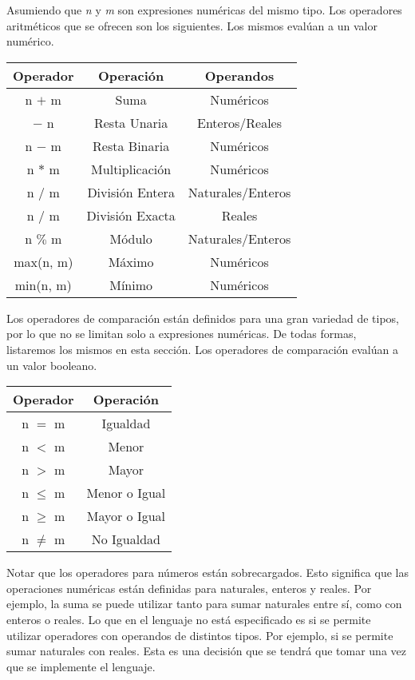 \documentclass{article}
\begin{document}
Asumiendo que \textit{n} y \textit{m} son expresiones numéricas del mismo tipo.
Los operadores aritméticos que se ofrecen son los siguientes.
Los mismos evalúan a un valor numérico.

\begin{center}
\begin{tabular}{| c | c | c |}
\hline
    Operador & Operación & Operandos\\
    \hline
    n $+$ m & Suma & Numéricos \\
    $-$ n & Resta Unaria & Enteros/Reales \\
    n $-$ m & Resta Binaria & Numéricos \\
    n $*$ m & Multiplicación & Numéricos \\
    n $/$ m & División Entera & Naturales/Enteros \\
    n $/$ m & División Exacta & Reales \\
    n $\%$ m & Módulo & Naturales/Enteros \\
    max(n, m) & Máximo & Numéricos \\
    min(n, m) & Mínimo & Numéricos \\
\hline
\end{tabular}
\end{center}

Los operadores de comparación están definidos para una gran variedad de tipos, por lo que no se limitan solo a expresiones numéricas.
De todas formas, listaremos los mismos en esta sección.
Los operadores de comparación evalúan a un valor booleano.

\begin{center}
\begin{tabular}{| c | c |}
\hline
    Operador & Operación \\
    \hline
    n $=$ m & Igualdad \\
    n $<$ m & Menor \\
    n $>$ m & Mayor \\
    n $\leq$ m & Menor o Igual \\
    n $\geq$ m & Mayor o Igual \\
    n $\neq$ m & No Igualdad \\
\hline
\end{tabular}
\end{center}

Notar que los operadores para números están sobrecargados.
Esto significa que las operaciones numéricas están definidas para naturales, enteros y reales.
Por ejemplo, la suma se puede utilizar tanto para sumar naturales entre sí, como con enteros o reales.
Lo que en el lenguaje no está especificado es si se permite utilizar operadores con operandos de distintos tipos.
Por ejemplo, si se permite sumar naturales con reales.
Esta es una decisión que se tendrá que tomar una vez que se implemente el lenguaje.
\end{document}
